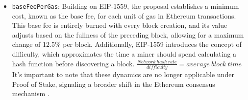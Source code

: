 \documentclass[fleqn,10pt]{olplainarticle}
\begin{document}
\begin{itemize}[noitemsep]
	\item \texttt{baseFeePerGas}: Building on EIP-1559, the proposal establishes a minimum cost, known as the base fee, for each unit of gas in Ethereum transactions. This base fee is entirely burned with every block creation, and its value adjusts based on the fullness of the preceding block, allowing for a maximum change of 12.5\% per block. Additionally, EIP-1559 introduces the concept of difficulty, which approximates the time a miner should spend calculating a hash function before discovering a block. 
	\begin{math}
		\frac{Network~hash~rate} {difficulty} = average~block~time
	\end{math}
	It's important to note that these dynamics are no longer applicable under Proof of Stake, signaling a broader shift in the Ethereum consensus mechanism \cite{buterin_eip1559_2019}.
	

\end{itemize}
\end{document}
